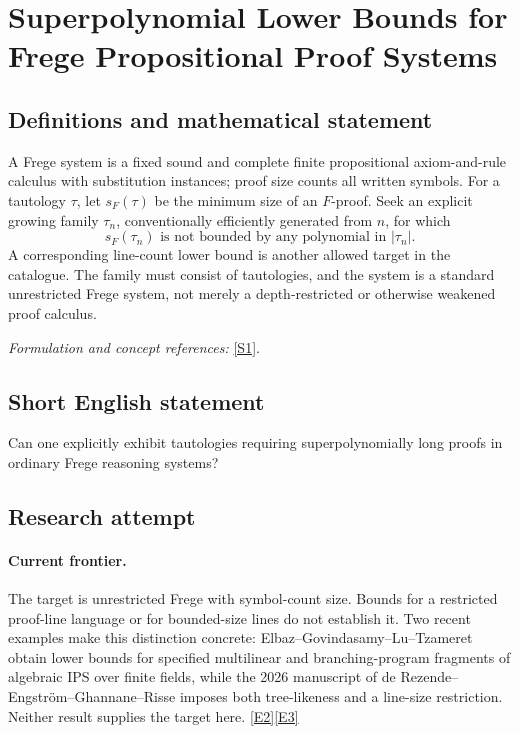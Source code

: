 \documentclass[11pt,a4paper]{article}
\newcommand{\sref}[2]{\hyperlink{source:#1:#2}{[S#2]}}
\newcommand{\eref}[2]{\hyperlink{extra:#1:#2}{[E#2]}}
\newif\ifshowcatalogue
\newcommand{\cataloguescope}[1]{\ifshowcatalogue
 \paragraph{Exact scope in the supplied catalogue.}
 \begin{quote}\small #1\end{quote}\fi}
\numberwithin{equation}{section}
\begin{document}
\setcounter{section}{103}
\clearpage
\section{\texorpdfstring{Superpolynomial Lower Bounds for Frege Propositional Proof Systems}{Superpolynomial Lower Bounds for Frege Propositional Proof Systems}}\label{104}
\subsection{Definitions and mathematical statement}
A Frege system is a fixed sound and complete finite propositional axiom-and-rule calculus with substitution instances; proof size counts all written symbols. For a tautology $\tau$, let $s_F(\tau)$ be the minimum size of an $F$-proof. Seek an explicit growing family $\tau_n$, conventionally efficiently generated from $n$, for which
\[
 s_F(\tau_n)\text{ is not bounded by any polynomial in }|\tau_n|.
\]
A corresponding line-count lower bound is another allowed target in the catalogue. The family must consist of tautologies, and the system is a standard unrestricted Frege system, not merely a depth-restricted or otherwise weakened proof calculus.
\par\smallskip\textit{Formulation and concept references:} \sref{104}{1}.
\cataloguescope{Prove a superpolynomial lower bound on the size, or number of lines, of proofs in standard Frege propositional proof systems for an explicit family of propositional tautologies.}
\subsection{Short English statement}
Can one explicitly exhibit tautologies requiring superpolynomially long proofs in ordinary Frege reasoning systems?
\subsection{Research attempt}

\paragraph{Current frontier.}
The target is unrestricted Frege with symbol-count size. Bounds for a
restricted proof-line language or for bounded-size lines do not establish it.
Two recent examples make this distinction concrete: Elbaz--Govindasamy--Lu--Tzameret
obtain lower bounds for specified multilinear and branching-program fragments
of algebraic IPS over finite fields, while the 2026 manuscript of
de Rezende--Engstr\"om--Ghannane--Risse imposes both tree-likeness and a line-size
restriction. Neither result supplies the target here.
\eref{104}{2}\eref{104}{3}
\end{document}
